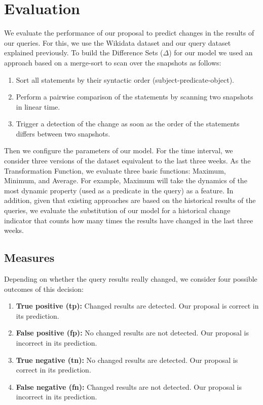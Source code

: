 \documentclass[runningheads]{llncs}
\begin{document}
\section{Evaluation}
\label{sec:eval}

We evaluate the performance of our proposal to predict changes in the results of our queries. For this, we use the Wikidata dataset and our query dataset explained previously.
To build the Difference Sets ($\Delta$) for our model we used an approach based on a merge-sort to scan over the snapshots as follows:

\begin{enumerate}
	\item Sort all statements by their syntactic order (subject-predicate-object).
	\item Perform a pairwise comparison of the statements by scanning two snapshots in linear time.
	\item Trigger a detection of the change as soon as the order of the statements differs between two snapshots.
\end{enumerate}

Then we configure the parameters of our model. For the time interval, we consider three versions of the dataset equivalent to the last three weeks. As the Transformation Function, we evaluate three basic functions: Maximum, Minimum, and Average. For example, Maximum will take the dynamics of the most dynamic property (used as a predicate in the query) as a feature.
In addition, given that existing approaches are based on the historical results of the queries, we evaluate the substitution of our model for a historical change indicator that counts how many times the results have changed in the last three weeks.

\subsection{Measures}

Depending on whether the query results really changed, we consider four possible outcomes of this decision:

\begin{enumerate}[label=\roman*]
	\item \textbf{True positive (tp):} Changed results are detected. Our proposal is correct in its prediction.
	\item \textbf{False positive (fp):} No changed results are not detected. Our proposal is incorrect in its prediction.
	\item \textbf{True negative (tn):} No changed results are detected. Our proposal is correct in its prediction.
	\item \textbf{False negative (fn):} Changed results are not detected. Our proposal is incorrect in its prediction.        
	
\end{enumerate}
\end{document}
